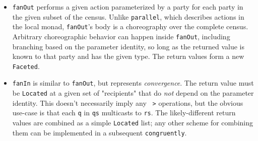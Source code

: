 \documentclass[sigplan,screen]{acmart}
\newcommand{\HLS}[1][small]{$\rotatebox[origin=c]{15}{\textphnc{e}}\hspace{-1pt}_{λ\mathrm{#1}}$\xspace}
\newcommand{\inlinecode}[2][haskell]{\texttt{#2}}
\begin{document}
\begin{itemize}[leftmargin=12pt, topsep=2pt]
          this gives the behavior of \HLS's auto-enclaving "case" expressions.
    \item \inlinecode{fanOut} performs a given action parameterized by a party
          for each party in the given subset of the census.
          Unlike \inlinecode{parallel}, which describes actions in the local monad,
          \inlinecode{fanOut}'s body is a choreography over the complete census.
          Arbitrary choreographic behavior can happen inside \inlinecode{fanOut},
          including branching based on the parameter identity,
          so long as the returned value is known to that party and has the given type.
          The return values form a new \inlinecode{Faceted}.
    \item \inlinecode{fanIn} is similar to \inlinecode{fanOut}, but represents \emph{convergence}.
          The return value must be \inlinecode{Located} at a given set of "recipients"
          that do \emph{not} depend on the parameter identity.
          This doesn't necessarily imply any \inlinecode{~>} operations,
          but the obvious use-case is that each \inlinecode{q} in \inlinecode{qs}
          multicasts to \inlinecode{rs}.
          The likely-different return values are combined as a simple \inlinecode{Located} list;
          any other scheme for combining them can be implemented
          in a subsequent \inlinecode{congruently}.
\end{itemize}
\end{document}
